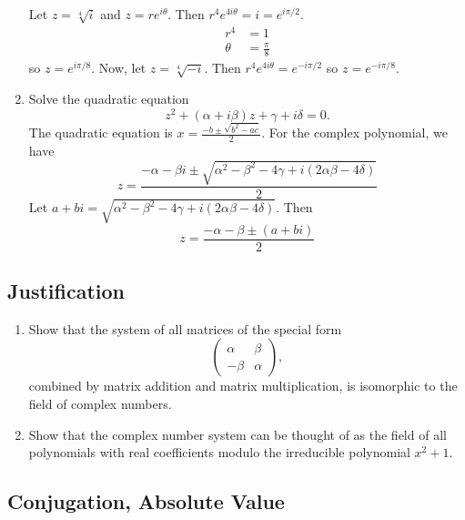 \begin{enumerate}
  Let \(z = \sqrt[4]{i}\) and \(z = re^{i\theta}\).
  Then \(r^4e^{4i\theta} = i = e^{i\pi/2}\).
    \begin{align*}
      r^4 & = 1\\
      \theta & = \frac{\pi}{8}
    \end{align*}
    so \(z = e^{i\pi/8}\).
    Now, let \(z = \sqrt[4]{-i}\).
    Then \(r^4e^{4i\theta} = e^{-i\pi/2}\) so \(z = e^{-i\pi/8}\).
\item
  Solve the quadratic equation
  \[
  z^2 + (\alpha + i\beta)z + \gamma + i\delta = 0.
  \]
  The quadratic equation is \(x = \frac{-b\pm\sqrt{b^2 - ac}}{2}\).
  For the complex polynomial, we have
  \[
  z = \frac{-\alpha - \beta i\pm
    \sqrt{\alpha^2 - \beta^2 - 4\gamma + i(2\alpha\beta - 4\delta)}}{2}
  \]
  Let
  \(a + bi = \sqrt{\alpha^2 - \beta^2 - 4\gamma + i(2\alpha\beta - 4\delta)}\).
  Then
  \[
  z = \frac{-\alpha - \beta\pm (a + bi)}{2}
  \]
\end{enumerate}

\subsection{Justification}

\begin{enumerate}
\item
  Show that the system of all matrices of the special form
  \[
  \begin{pmatrix}
    \alpha & \beta\\
    -\beta & \alpha
  \end{pmatrix},
  \]
  combined by matrix addition and matrix multiplication, is isomorphic to the
  field of complex numbers.
\item
  Show that the complex number system can be thought of as the field of all
  polynomials with real coefficients modulo the irreducible polynomial
  \(x^2 + 1\).
\end{enumerate}

\subsection{Conjugation, Absolute Value}

